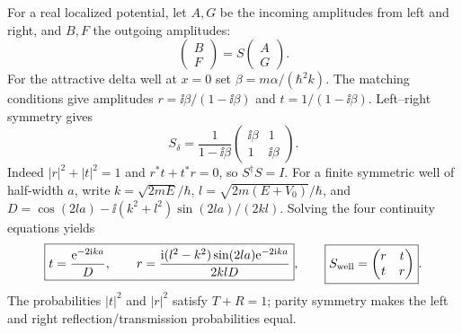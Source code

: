 For a real localized potential, let $A,G$ be
the incoming amplitudes from left and right,
and $B,F$ the outgoing amplitudes:
\begin{equation}
\begin{pmatrix}B\\F\end{pmatrix}
=S\begin{pmatrix}A\\G\end{pmatrix}.
\end{equation}
For the attractive delta well at $x=0$ set
$\beta=m\alpha/(\hbar^2k)$.
The matching conditions give amplitudes
$r=\ii\beta/(1-\ii\beta)$ and
$t=1/(1-\ii\beta)$. Left--right symmetry gives
\begin{equation}
\boxed{S_{\delta}=
\frac1{1-\ii\beta}
\begin{pmatrix}\ii\beta&1\\1&\ii\beta\end{pmatrix}}.
\end{equation}
Indeed $|r|^2+|t|^2=1$ and
$r^*t+t^*r=0$, so $S^\dagger S=I$.
For a finite symmetric well of half-width $a$,
write $k=\sqrt{2mE}/\hbar$,
$l=\sqrt{2m(E+V_0)}/\hbar$,
and
$D=\cos(2la)-\ii(k^2+l^2)\sin(2la)/(2kl)$.
Solving the four continuity equations yields
\begin{equation}
\boxed{t=\frac{\mathrm e^{-2\mathrm i ka}}{D},\qquad
r=\frac{\mathrm i(l^2-k^2)\sin(2la)\mathrm e^{-2\mathrm i ka}}{2klD}},
\qquad
\boxed{S_{\rm well}=\begin{pmatrix}r&t\\t&r\end{pmatrix}}.
\end{equation}
The probabilities $|t|^2$ and $|r|^2$
satisfy $T+R=1$; parity symmetry makes
the left and right reflection/transmission
probabilities equal.

